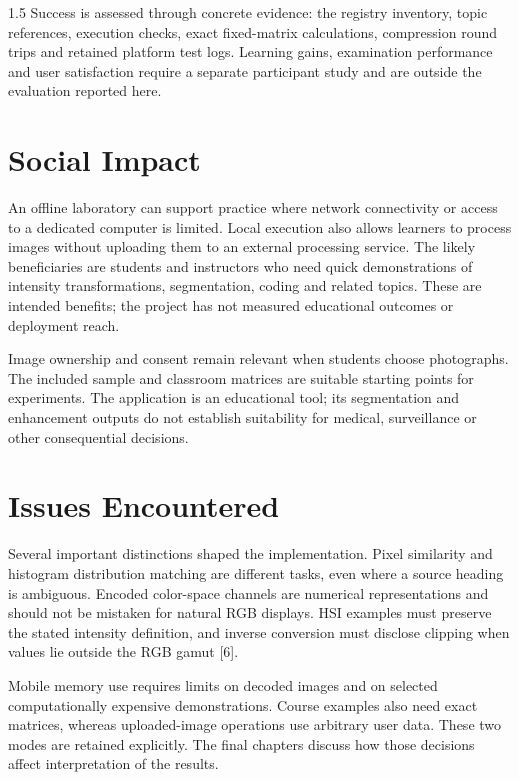 \begin{spacing}{1.5}
Success is assessed through concrete evidence: the registry inventory, topic references, execution checks, exact fixed-matrix calculations, compression round trips and retained platform test logs. Learning gains, examination performance and user satisfaction require a separate participant study and are outside the evaluation reported here.

\section{Social Impact}
An offline laboratory can support practice where network connectivity or access to a dedicated computer is limited. Local execution also allows learners to process images without uploading them to an external processing service. The likely beneficiaries are students and instructors who need quick demonstrations of intensity transformations, segmentation, coding and related topics. These are intended benefits; the project has not measured educational outcomes or deployment reach.

Image ownership and consent remain relevant when students choose photographs. The included sample and classroom matrices are suitable starting points for experiments. The application is an educational tool; its segmentation and enhancement outputs do not establish suitability for medical, surveillance or other consequential decisions.

\section{Issues Encountered}
Several important distinctions shaped the implementation. Pixel similarity and histogram distribution matching are different tasks, even where a source heading is ambiguous. Encoded color-space channels are numerical representations and should not be mistaken for natural RGB displays. HSI examples must preserve the stated intensity definition, and inverse conversion must disclose clipping when values lie outside the RGB gamut [6].

Mobile memory use requires limits on decoded images and on selected computationally expensive demonstrations. Course examples also need exact matrices, whereas uploaded-image operations use arbitrary user data. These two modes are retained explicitly. The final chapters discuss how those decisions affect interpretation of the results.

\end{spacing}